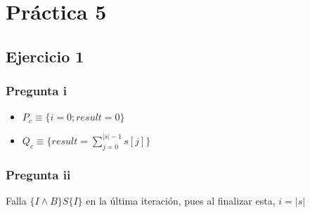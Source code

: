 
\usepackage{caratula}
\usepackage{enumerate}
\usepackage{hyperref}
\usepackage{graphicx}
\usepackage{amsfonts}
\usepackage{enumitem}
\usepackage{listings} %

\decimalpoint
\hypersetup{colorlinks=true, linkcolor=black, urlcolor=blue}
\setlength{\parindent}{0em}
\setlength{\parskip}{0.5em}
\setcounter{tocdepth}{2} %
\setcounter{section}{4} %
\renewcommand{\thesubsubsection}{\thesubsection.\Alph{subsubsection}}
\graphicspath{ {images/} }





\maketitle
\newpage

\tableofcontents
\newpage


\section{Práctica 5}

\subsection{Ejercicio 1}

\subsubsection{Pregunta i}

\begin{itemize}
    \item $ P_c \equiv \{ i = 0; result = 0 \} $
    \item $ Q_c \equiv \{ result = \sum_{j = 0}^{|s| - 1}s[j] \} $
\end{itemize}

\subsubsection{Pregunta ii}

Falla $ \{ I \wedge B \}S\{ I \} $ en la última iteración, pues al finalizar esta, $i = |s|$


